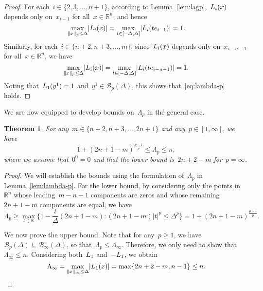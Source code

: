 \documentclass[draft]{article}
\numberwithin{equation}{section}
\theoremstyle{definition}
\theoremstyle{plain}
\newtheorem{theorem}{Theorem}[section]
\newcommand{\abs}[2][]{#1\lvert#2#1\rvert}
\newcommand{\lagp}[1][]{L\ifblank{#1}{}{_{#1}}}
\newcommand{\norm}[2][]{#1\lVert#2#1\rVert}
\newcommand{\R}{\mathbb{R}}
\newcommand{\set}[2][]{#1\{#2#1\}}
\begin{document}
\begin{proof}
    For each~$i \in \set{2, 3, \dots, n + 1}$, according to Lemma~\ref{lem:lagp},~$\lagp[i](x)$ depends only on~$x_{i - 1}$ for all~$x \in \R^n$, and hence
    \begin{equation*}
        \max_{\norm{x}_p \le \Delta} \abs{\lagp[i](x)} = \max_{t \in [-\Delta, \Delta]} \abs{\lagp[i](t e_{i - 1})} = 1.
    \end{equation*}
    Similarly, for each~$i \in \set{n + 2, n + 3, \dots, m}$, since~$\lagp[i](x)$ depends only on~$x_{i - n - 1}$ for all~$x \in \R^n$, we have
    \begin{equation*}
        \max_{\norm{x}_p \le \Delta} \abs{\lagp[i](x)} = \max_{t \in [-\Delta, \Delta]} \abs{\lagp[i](t e_{i - n - 1})} = 1.
    \end{equation*}
    Noting that~$\lagp[1](y^1) = 1$ and~$y^1 \in \mathcal{B}_p(\Delta)$, this shows that~\eqref{eq:lambda-p} holds.
\end{proof}

We are now equipped to develop bounds on~$\Lambda_p$ in the general case.

\begin{theorem}
    \label{thm:lambda-p}
    For any~$m \in \set{n + 2, n + 3, \dots, 2n + 1}$ and any~$p \in [1, \infty]$, we have
    \begin{equation*}
        1 + (2n + 1 - m)^{\frac{p - 1}{p}} \le \Lambda_p \le n,
    \end{equation*}
    where we assume that~$0^0 = 0$ and that the lower bound is~$2n + 2 - m$ for~$p = \infty$.
\end{theorem}

\begin{proof}
    We will establish the bounds using the formulation of~$\Lambda_p$ in Lemma~\ref{lem:lambda-p}.
    For the lower bound, by considering only the points in~$\R^n$ whose leading~$m - n - 1$ components are zeros and whose remaining~$2n + 1 - m$ components are equal, we have
    \begin{equation*}
        \Lambda_p \ge \max_{t \in \R} \set{1 - \frac{t}{\Delta} (2n + 1 - m) : (2n + 1 - m) \abs{t}^p \le \Delta^p} = 1 + (2n + 1 - m)^{\frac{p - 1}{p}}.
    \end{equation*}

    We now prove the upper bound.
    Note that for any~$p \ge 1$, we have~$\mathcal{B}_p(\Delta) \subseteq \mathcal{B}_{\infty}(\Delta)$, so that~$\Lambda_p \le \Lambda_{\infty}$.
    Therefore, we only need to show that~$\Lambda_{\infty} \le n$.
    Considering both~$\lagp[1]$ and~$-\lagp[1]$, we obtain
    \begin{equation*}
        \Lambda_{\infty} = \max_{\norm{x}_{\infty} \le \Delta} \abs{\lagp[1](x)} = \max \set{2n + 2 - m, n - 1} \le n.
    \end{equation*}
\end{proof}
\end{document}
